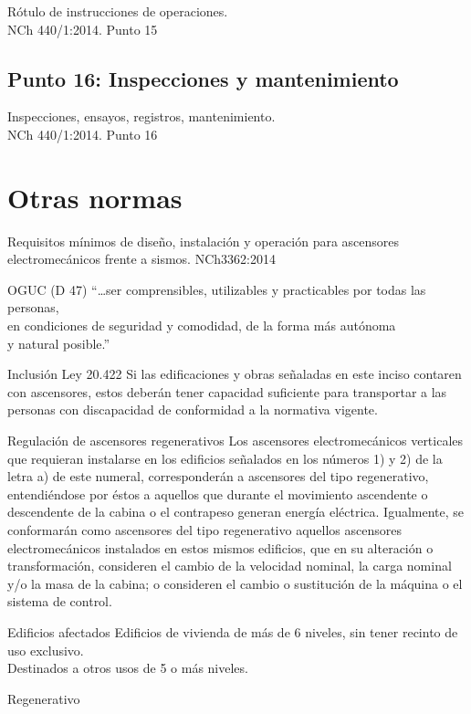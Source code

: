 \begin{frame}{Rótulo de instrucciones de operaciones.\\NCh 440/1:2014. Punto 15}
\end{frame}

\subsection{Punto 16: Inspecciones y mantenimiento}
\begin{frame}{Inspecciones, ensayos, registros, mantenimiento.\\NCh 440/1:2014. Punto 16}
\end{frame}

\section{Otras normas}
\begin{frame}{Requisitos mínimos de diseño, instalación y operación para ascensores\\electromecánicos frente a sismos. NCh3362:2014}
\end{frame}

\begin{frame}{OGUC (D 47)}
	“…ser comprensibles, utilizables y practicables por todas las personas,\\
	en condiciones de seguridad y comodidad, de la forma más autónoma\\
	y natural posible.”
\end{frame}

\begin{frame}{Inclusión Ley 20.422}
	Si las edificaciones y obras señaladas en este inciso contaren con ascensores, estos deberán tener capacidad suficiente para transportar a las personas con discapacidad de conformidad a la normativa vigente.
\end{frame}

\begin{frame}{Regulación de ascensores regenerativos}
	Los ascensores electromecánicos verticales que requieran instalarse en los edificios señalados en los números 1) y 2) de la letra a) de este numeral, corresponderán a ascensores del tipo regenerativo, entendiéndose por éstos a aquellos que durante el movimiento ascendente o descendente de la cabina o el contrapeso generan energía eléctrica. Igualmente, se conformarán como ascensores del tipo regenerativo aquellos ascensores electromecánicos instalados en estos mismos edificios, que en su alteración o transformación, consideren el cambio de la velocidad nominal, la carga nominal y/o la masa de la cabina; o consideren el cambio o sustitución de la máquina o el sistema de control.
\end{frame}

\begin{frame}{Edificios afectados}
	Edificios de vivienda de más de 6 niveles, sin tener recinto de uso exclusivo.\\
	Destinados a otros usos de 5 o más niveles.
\end{frame}

\begin{frame}{Regenerativo}
\end{frame}